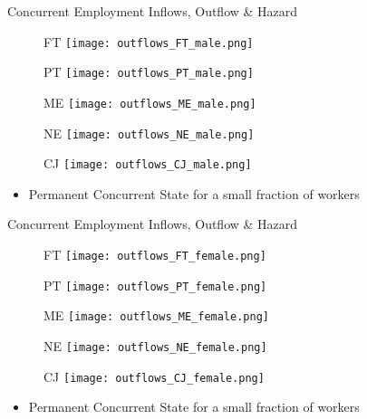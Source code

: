 \documentclass[hyperref={bookmarks=false}]{beamer}
\let\oldcite=\cite
\renewcommand{\cite}[1]{\textcolor[rgb]{.0,.2,.7}{\oldcite{#1}}}
\begin{document}
\begin{appendix}
\begin{frame}{Concurrent Employment Inflows, Outflow \& Hazard}
\begin{figure}[!t]
	\centering
	\begin{minipage}[b]{0.3\textwidth}{FT}
		\centering
		\texttt{[image: outflows\_FT\_male.png]}
	\end{minipage}
	\begin{minipage}[b]{0.3\textwidth}{PT}
		\centering
		\texttt{[image: outflows\_PT\_male.png]}
	\end{minipage}
	\begin{minipage}[b]{0.3\textwidth}{ME}
		\centering
		\texttt{[image: outflows\_ME\_male.png]}
	\end{minipage}
	\begin{minipage}[b]{0.3\textwidth}{NE}
		\centering
		\texttt{[image: outflows\_NE\_male.png]}
	\end{minipage}
	\begin{minipage}[b]{0.3\textwidth}{CJ}
		\centering
		\texttt{[image: outflows\_CJ\_male.png]}
	\end{minipage}
\end{figure}
\begin{itemize}
	\setlength{\itemsep}{0.7 cm}
	\item Permanent Concurrent State for a small fraction of workers \cite{CarriTuRo15}
\end{itemize}
\end{frame}

\begin{frame}{Concurrent Employment Inflows, Outflow \& Hazard}
\begin{figure}[!t]
	\centering
	\begin{minipage}[b]{0.3\textwidth}{FT}
		\centering
		\texttt{[image: outflows\_FT\_female.png]}
	\end{minipage}
	\begin{minipage}[b]{0.3\textwidth}{PT}
		\centering
		\texttt{[image: outflows\_PT\_female.png]}
	\end{minipage}
	\begin{minipage}[b]{0.3\textwidth}{ME}
		\centering
		\texttt{[image: outflows\_ME\_female.png]}
	\end{minipage}
	\begin{minipage}[b]{0.3\textwidth}{NE}
		\centering
		\texttt{[image: outflows\_NE\_female.png]}
	\end{minipage}
	\begin{minipage}[b]{0.3\textwidth}{CJ}
		\centering
		\texttt{[image: outflows\_CJ\_female.png]}
	\end{minipage}
\end{figure}
\begin{itemize}
	\setlength{\itemsep}{0.7 cm}
	\item Permanent Concurrent State for a small fraction of workers \cite{CarriTuRo15}
\end{itemize}
\end{frame}




\end{appendix}
\end{document}
